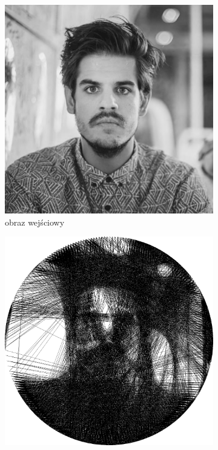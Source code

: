     
    \begin{figure}[H] 
    \centering
    \begin{subfigure}{0.32\textwidth}
        \centering
        \includegraphics[width = \textwidth]{img/4-mine/taco-mask/taco-grey.png}
        \caption{obraz wejściowy}
        \label{mine-param-taco-thread-a}
    \end{subfigure}
    \begin{subfigure}{0.32\textwidth}
        \centering
        \includegraphics[width = \textwidth]{img/4-mine/taco-thread/taco_e_i3000_c20_inv0_bg1_obj1_ed1.png}

\end{subfigure}
\end{figure}
